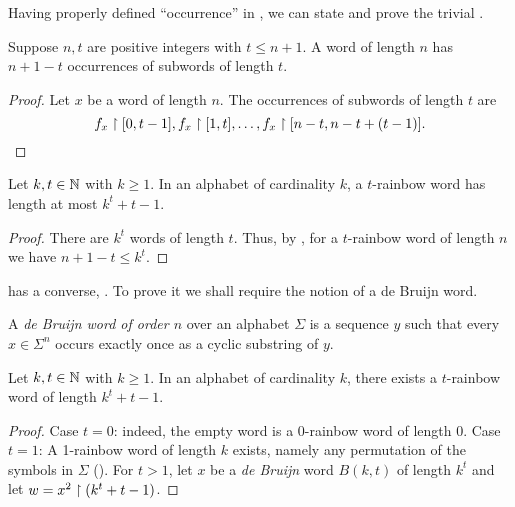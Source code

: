 		Having properly defined ``occurrence'' in , we can state and prove the trivial .
		\begin{lemma}\label{lem:num-occ}
		Suppose $n,t$ are positive integers with $t\le n+1$.
		A word of length $n$ has $n+1-t$ occurrences of subwords of length $t$.
		\end{lemma}
		\begin{proof}
			Let $x$ be a word of length $n$.
			The occurrences of subwords of length $t$ are
			\[
				f_x\upharpoonright [0,t-1],
				f_x\upharpoonright [1,t],
				\dots,
				f_x\upharpoonright [n-t,n-t+(t-1)].\qedhere
			\]
		\end{proof}
		\begin{theorem}\label{sep18-2022}
			Let $k,t\in\mathbb{N}$ with $k\ge 1$.
			In an alphabet of cardinality $k$, a $t$-rainbow word has length at most $k^t+t-1$.
		\end{theorem}
		\begin{proof}
			There are $k^t$ words of length $t$.
			Thus, by , for a $t$-rainbow word of length $n$ we have $n+1-t \le k^t$.
		\end{proof}
		 has a converse,
		. To prove it we shall require the notion of a de Bruijn word.
		\begin{definition}
			\label{df:de-bruijn}
			A \emph{de Bruijn word of order $n$} over an alphabet $\Sigma$ is a sequence $y$
			such that every $x\in\Sigma^n$ occurs exactly once as a cyclic substring of $y$.
		\end{definition}
		\begin{theorem}\label{feb6-2023}
			Let $k,t\in\mathbb{N}$ with $k\ge 1$.
			In an alphabet of cardinality $k$, there exists a $t$-rainbow word of length $k^t+t-1$.
		\end{theorem}
		\begin{proof}
			Case $t=0$: indeed, the empty word is a 0-rainbow word of length 0.
			Case $t=1$:	A 1-rainbow word of length $k$ exists, namely any permutation of the symbols in $\Sigma$ ().
		For $t>1$, let $x$ be a \emph{de Bruijn} word $B(k,t)$ of length $k^t$ and let $w= x^2\upharpoonright (k^t+t-1)$.
		\end{proof}
